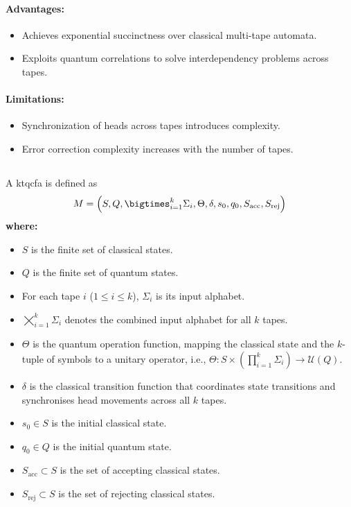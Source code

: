 \paragraph{Advantages:}
\begin{itemize}
    \item Achieves exponential succinctness over classical multi-tape automata.
    \item Exploits quantum correlations to solve interdependency problems across tapes.
\end{itemize}

\paragraph{Limitations:}
\begin{itemize}
    \item Synchronization of heads across tapes introduces complexity.
    \item Error correction complexity increases with the number of tapes.
\end{itemize}

\subsection{}
\label{subsec:ktqcfa}
\begin{definition}
A \gls{ktqcfa} is defined as 
\[
M = \Bigl(S, Q, \bigtimes_{i=1}^{k} \Sigma_i, \Theta, \delta, s_0, q_0, S_{\text{acc}}, S_{\text{rej}}\Bigr)
\]
\textbf{where:}
\begin{itemize}
    \item \( S \) is the finite set of classical states.
    \item \( Q \) is the finite set of quantum states.
    \item For each tape \( i \) (\( 1 \leq i \leq k \)), \( \Sigma_i \) is its input alphabet.
    \item \( \bigtimes_{i=1}^{k} \Sigma_i \) denotes the combined input alphabet for all \( k \) tapes.
    \item \( \Theta \) is the quantum operation function, mapping the classical state and the \( k \)-tuple of symbols to a unitary operator, i.e., \(\Theta: S \times \left(\prod_{i=1}^{k} \Sigma_i\right) \to \mathcal{U}(Q)\).
    \item \( \delta \) is the classical transition function that coordinates state transitions and synchronises head movements across all \( k \) tapes.
    \item \( s_0 \in S \) is the initial classical state.
    \item \( q_0 \in Q \) is the initial quantum state.
    \item \( S_{\text{acc}} \subset S \) is the set of accepting classical states.
    \item \( S_{\text{rej}} \subset S \) is the set of rejecting classical states.
\end{itemize}
\end{definition}

